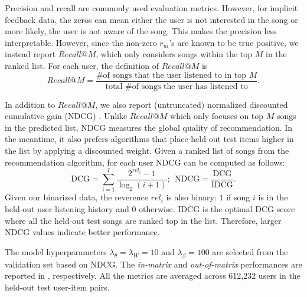 Precision and recall are commonly used evaluation metrics. However, for implicit feedback data, the zeros can mean either the user is not interested in the song or more likely, the user is not aware of the song. This makes the precision less interpretable. However, since the non-zero $r_{ui}$'s are known to be true positive, we instead report $Recall@M$, which only considers songs within the top $M$ in the ranked list. For each user, the definition of $Recall@M$ is
\[
Recall@M = \frac{\text{{\# of songs that the user listened to in top $M$}}}{\text{{total \# of songs the user has listened to}}}.
\]

In addition to $Recall@M$, we also report (untruncated) normalized discounted cumulative gain (NDCG) \citep{jarvelin2002cumulated}. Unlike $Recall@M$ which only focuses on top $M$ songs in the predicted list, NDCG measures the global quality of recommendation. In the meantime, it also prefers algorithms that place held-out test items higher in the list by applying a discounted weight.
Given a ranked list of songs from the recommendation algorithm, for each user NDCG can be computed as follows: 
\[
\text{DCG} = \sum_{i=1}^I \frac{2^{rel_i} - 1}{\log_2 (i + 1)}; ~~ \text{NDCG} = \frac{\text{DCG}}{\text{IDCG}}.
\]
Given our binarized data, the reverence $rel_i$ is also binary: $1$ if song $i$ is in the held-out user listening history and $0$ otherwise. IDCG is the optimal DCG score where all the held-out test songs are ranked top in the list. Therefore, larger NDCG values indicate better performance. 

 The model hyperparameters $\lambda_\theta =  \lambda_W = 10$ and $\lambda_\beta = 100$ are selected from the validation set based on NDCG. The \emph{in-matrix} and \emph{out-of-matrix} performances are reported in , respectively. All the metrics are averaged across 612,232 users in the held-out test user-item pairs.

